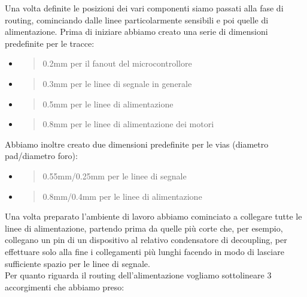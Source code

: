 \noindent Una volta definite le posizioni dei vari componenti siamo passati alla
fase di routing, cominciando dalle linee particolarmente sensibili e poi
quelle di alimentazione. Prima di iniziare abbiamo creato una serie di
dimensioni predefinite per le tracce:

\begin{itemize}
\item
  \begin{quote}
  0.2mm per il fanout del microcontrollore
  \end{quote}
\item
  \begin{quote}
  0.3mm per le linee di segnale in generale
  \end{quote}
\item
  \begin{quote}
  0.5mm per le linee di alimentazione
  \end{quote}
\item
  \begin{quote}
  0.8mm per le linee di alimentazione dei motori
  \end{quote}
\end{itemize}

\noindent Abbiamo inoltre creato due dimensioni predefinite per le vias (diametro
pad/diametro foro):

\begin{itemize}
\item
  \begin{quote}
  0.55mm/0.25mm per le linee di segnale
  \end{quote}
\item
  \begin{quote}
  0.8mm/0.4mm per le linee di alimentazione
  \end{quote}
\end{itemize}

\noindent Una volta preparato l'ambiente di lavoro abbiamo cominciato a collegare
tutte le linee di alimentazione, partendo prima da quelle più corte che,
per esempio, collegano un pin di un dispositivo al relativo condensatore
di decoupling, per effettuare solo alla fine i collegamenti più lunghi
facendo in modo di lasciare sufficiente spazio per le linee di segnale.\\
Per quanto riguarda il routing dell'alimentazione vogliamo sottolineare
3 accorgimenti che abbiamo preso:

